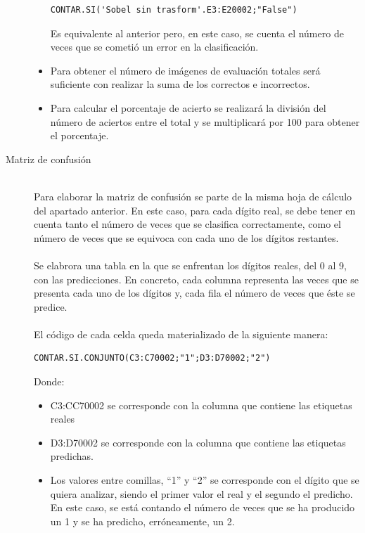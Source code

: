 \begin{description}
\begin{itemize}
{		\vspace{10pt}
		\begin{lstlisting}[frame=single]
	CONTAR.SI('Sobel sin trasform'.E3:E20002;"False")
		\end{lstlisting}
		Es equivalente al anterior pero, en este caso, se cuenta el número de veces que se cometió un error en la clasificación.
	}
	\item{Para obtener el número de imágenes de evaluación totales será suficiente con realizar la suma de los correctos e incorrectos.
	}
	\item{Para calcular el porcentaje de acierto se realizará la división del número de aciertos entre el total y se multiplicará por 100 para obtener el porcentaje.
	}
	\end{itemize}
	\vspace{5pt}
	\item[Matriz de confusión] \hfill 
	\vspace{5pt}
	\\
	Para elaborar la matriz de confusión se parte de la misma hoja de cálculo del apartado anterior. En este caso, para cada dígito real, se debe tener en cuenta tanto el número de veces que se clasifica correctamente, como el número de veces que se equivoca con cada uno de los dígitos restantes.\\
	\vspace{-10pt}
	\\
	Se elabrora una tabla en la que se enfrentan los dígitos reales, del 0 al 9, con las predicciones. En concreto, cada columna representa las veces que se presenta cada uno de los dígitos y, cada fila el número de veces que éste se predice.\\
	\vspace{-10pt}
	\\
	El código de cada celda queda materializado de la siguiente manera:
	\vspace{10pt}
	\begin{lstlisting}[frame=single]
	CONTAR.SI.CONJUNTO(C3:C70002;"1";D3:D70002;"2")
	\end{lstlisting}
	Donde:
	\begin{itemize}
		\item C3:CC70002 se corresponde con la columna que contiene las etiquetas reales
		\item D3:D70002 se corresponde con la columna que contiene las etiquetas predichas.
		\item Los valores entre comillas, ``1'' y ``2'' se corresponde con el dígito que se quiera analizar, siendo el primer valor el real y el segundo el predicho. En este caso, se está contando el número de veces que se ha producido un 1 y se ha predicho, erróneamente, un 2.
	\end{itemize}
	

\end{description}
